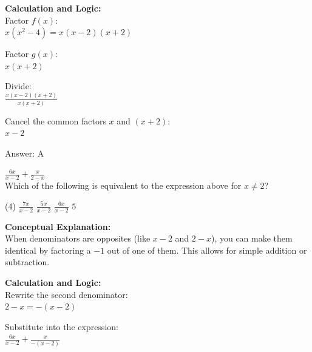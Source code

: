 \documentclass[11pt,paper=a4,answers]{exam}
\begin{document}
\begin{questions}
\begin{solution}
\vspace{20pt}

\textbf{Calculation and Logic:} \\
Factor $f(x)$: \\
$x(x^2 - 4) = x(x-2)(x+2)$

\vspace{10pt}

Factor $g(x)$: \\
$x(x+2)$

\vspace{10pt}

Divide: \\
$\frac{x(x-2)(x+2)}{x(x+2)}$

\vspace{10pt}

Cancel the common factors $x$ and $(x+2)$: \\
$x-2$

\vspace{25pt}

Answer: \colorbox{yellow!100}{A}
\end{solution}

\vspace{40pt}

\question
$\frac{6x}{x-2} + \frac{x}{2-x}$ \\
Which of the following is equivalent to the expression above for $x \neq 2$?
\begin{tasks}(4)
    \task $\frac{7x}{x-2}$
    \task $\frac{5x}{x-2}$
    \task $\frac{6x}{x-2}$
    \task $5$
\end{tasks}

\begin{solution}
\textbf{Conceptual Explanation:} \\
When denominators are opposites (like $x-2$ and $2-x$), you can make them identical by factoring a $-1$ out of one of them. This allows for simple addition or subtraction.

\vspace{20pt}

\textbf{Calculation and Logic:} \\
Rewrite the second denominator: \\
$2-x = -(x-2)$

\vspace{10pt}

Substitute into the expression: \\
$\frac{6x}{x-2} + \frac{x}{-(x-2)}$


\end{solution}
\end{questions}
\end{document}
